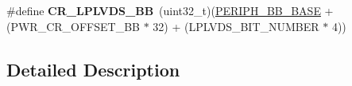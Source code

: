 \begin{DoxyCompactItemize}
\item 
\#define {\bfseries C\+R\+\_\+\+L\+P\+L\+V\+D\+S\+\_\+\+BB}~(uint32\+\_\+t)(\hyperlink{group___peripheral__memory__map_gaed7efc100877000845c236ccdc9e144a}{P\+E\+R\+I\+P\+H\+\_\+\+B\+B\+\_\+\+B\+A\+SE} + (P\+W\+R\+\_\+\+C\+R\+\_\+\+O\+F\+F\+S\+E\+T\+\_\+\+BB $\ast$ 32) + (L\+P\+L\+V\+D\+S\+\_\+\+B\+I\+T\+\_\+\+N\+U\+M\+B\+ER $\ast$ 4))\hypertarget{group___p_w_r_ex__register__alias__address_gadf91aa0d2f93b4cc91f2f6ca82200faf}{}\label{group___p_w_r_ex__register__alias__address_gadf91aa0d2f93b4cc91f2f6ca82200faf}

\end{DoxyCompactItemize}


\subsection{Detailed Description}
